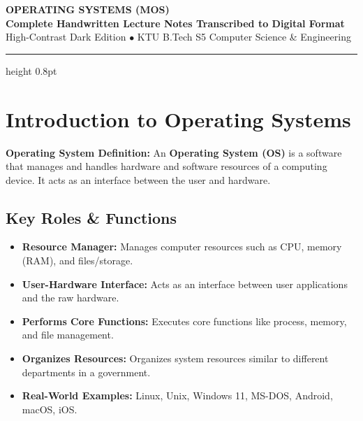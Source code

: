 \documentclass[10pt,a4paper]{article}
\begin{document}
\begin{center}
    {\fontsize{20}{24}\selectfont \textbf{\textcolor{accentBlue}{OPERATING SYSTEMS (MOS)}}}\\[4pt]
    {\normalsize \textcolor{accentCyan}{\textbf{Complete Handwritten Lecture Notes Transcribed to Digital Format}}}\\[2pt]
    {\footnotesize \textcolor{textMuted}{High-Contrast Dark Edition $\bullet$ KTU B.Tech S5 Computer Science \& Engineering}}
    \vspace{4pt}
    \hrule height 0.8pt \relax
    \vspace{6pt}
\end{center}

\section{Introduction to Operating Systems}

\begin{defbox}
    \textbf{\textcolor{accentBlue}{Operating System Definition:}} An \textbf{Operating System (OS)} is a software that manages and handles hardware and software resources of a computing device. It acts as an interface between the user and hardware.
\end{defbox}

\subsection*{Key Roles \& Functions}
\begin{itemize}
    \item \textbf{Resource Manager:} Manages computer resources such as CPU, memory (RAM), and files/storage.
    \item \textbf{User-Hardware Interface:} Acts as an interface between user applications and the raw hardware.
    \item \textbf{Performs Core Functions:} Executes core functions like process, memory, and file management.
    \item \textbf{Organizes Resources:} Organizes system resources similar to different departments in a government.
    \item \textbf{Real-World Examples:} Linux, Unix, Windows 11, MS-DOS, Android, macOS, iOS.
\end{itemize}
\end{document}
